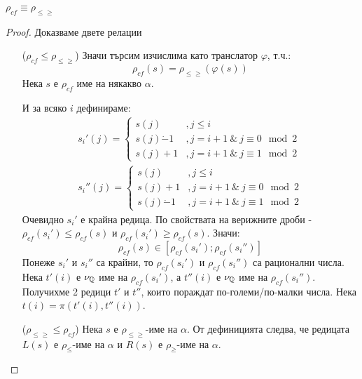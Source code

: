 \begin{problem}
$\rho_{cf} \equiv \rho_{\leq\geq}$
\end{problem}
\begin{proof}
    Доказваме двете релации
    \begin{itemize}
        \item[($\rho_{cf} \leq \rho_{\leq\geq}$)] Значи търсим изчислима като транслатор $\varphi$, т.ч.:
            \begin{equation}
                \rho_{cf}(s) = \rho_{\leq\geq}(\varphi(s))
            \end{equation}
            Нека $s$ е $\rho_{cf}$ име на някакво $\alpha$.

            И за всяко $i$ дефинираме:
            \begin{equation}
                \begin{split}
                    s_i'(j) = \begin{cases}
                        s(j)          & , j \leq i                       \\
                        s(j) \dot - 1 & , j = i+1\ \&\ j \equiv 0 \mod 2 \\
                        s(j) + 1      & , j = i+1\ \&\ j \equiv 1 \mod 2
                    \end{cases} \\
                    s_i''(j) = \begin{cases}
                        s(j)          & , j \leq i                       \\
                        s(j) + 1      & , j = i+1\ \&\ j \equiv 0 \mod 2 \\
                        s(j) \dot - 1 & , j = i+1\ \&\ j \equiv 1 \mod 2
                    \end{cases}
                \end{split}
            \end{equation}
            Очевидно $s_i'$ е крайна редица. По свойствата на верижните дроби - $\rho_{cf}(s_i') \leq \rho_{cf}(s)$ и $\rho_{cf}(s_i') \geq \rho_{cf}(s)$. Значи:
            \begin{equation}
                \rho_{cf}(s) \in \left[\rho_{cf}(s_i'); \rho_{cf}(s_i'') \right]
            \end{equation}
            Понеже $s_i'$ и $s_i''$ са крайни, то $\rho_{cf}(s_i')$ и $\rho_{cf}(s_i'')$ са рационални числа. Нека $t'(i)$ е $\nu_{\mathbb{Q}}$ име на $\rho_{cf}(s_i')$, а $t''(i)$ е $\nu_{\mathbb{Q}}$ име на $\rho_{cf}(s_i'')$. Получихме 2 редици $t'$ и $t''$, които пораждат по-големи/по-малки числа. Нека $t(i) = \pi(t'(i), t''(i))$.
        \item[($\rho_{\leq\geq} \leq \rho_{cf}$)] Нека $s$ е $\rho_{\leq\geq}$-име на $\alpha$. От дефиницията следва, че редицата $L(s)$ е $\rho_\leq$-име на $\alpha$ и $R(s)$ е $\rho_\geq$-име на $\alpha$.
    \end{itemize}
\end{proof}